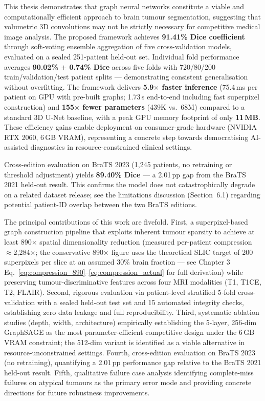 \documentclass{article}
\begin{document}
This thesis demonstrates that graph neural networks constitute a viable and computationally efficient approach to brain tumour segmentation, suggesting that volumetric 3D convolutions may not be strictly necessary for competitive medical image analysis. The proposed framework achieves \textbf{91.41\% Dice coefficient} through soft-voting ensemble aggregation of five cross-validation models, evaluated on a sealed 251-patient held-out set. Individual fold performance averages \textbf{90.02\% $\pm$ 0.74\% Dice} across five folds with 720/80/200 train/validation/test patient splits — demonstrating consistent generalisation without overfitting. The framework delivers \textbf{5.9$\times$ faster inference} (75.4\,ms per patient on GPU with pre-built graphs; 1.73\,s end-to-end including fast superpixel construction) and \textbf{155$\times$ fewer parameters} (439K vs.\ 68M) compared to a standard 3D U-Net baseline, with a peak GPU memory footprint of only \textbf{11\,MB}. These efficiency gains enable deployment on consumer-grade hardware (NVIDIA RTX 2060, 6\,GB VRAM), representing a concrete step towards democratising AI-assisted diagnostics in resource-constrained clinical settings.

Cross-edition evaluation on BraTS 2023 (1,245 patients, no retraining or threshold adjustment) yields \textbf{89.40\% Dice} — a 2.01\,pp gap from the BraTS 2021 held-out result. This confirms the model does not catastrophically degrade on a related dataset release; see the limitations discussion (Section~6.1) regarding potential patient-ID overlap between the two BraTS editions.

The principal contributions of this work are fivefold. First, a superpixel-based graph construction pipeline that exploits inherent tumour sparsity to achieve at least 890$\times$ spatial dimensionality reduction (measured per-patient compression $\approx$2,284$\times$; the conservative 890$\times$ figure uses the theoretical SLIC target of 200 superpixels per slice at an assumed 30\% brain fraction — see Chapter 3 Eq.~\ref{eq:compression_890}--\ref{eq:compression_actual} for full derivation) while preserving tumour-discriminative features across four MRI modalities (T1, T1CE, T2, FLAIR). Second, rigorous evaluation via patient-level stratified 5-fold cross-validation with a sealed held-out test set and 15 automated integrity checks, establishing zero data leakage and full reproducibility. Third, systematic ablation studies (depth, width, architecture) empirically establishing the 5-layer, 256-dim GraphSAGE as the most parameter-efficient competitive design under the 6\,GB VRAM constraint; the 512-dim variant is identified as a viable alternative in resource-unconstrained settings. Fourth, cross-edition evaluation on BraTS 2023 (no retraining), quantifying a 2.01\,pp performance gap relative to the BraTS 2021 held-out result. Fifth, qualitative failure case analysis identifying complete-miss failures on atypical tumours as the primary error mode and providing concrete directions for future robustness improvements.
\end{document}
